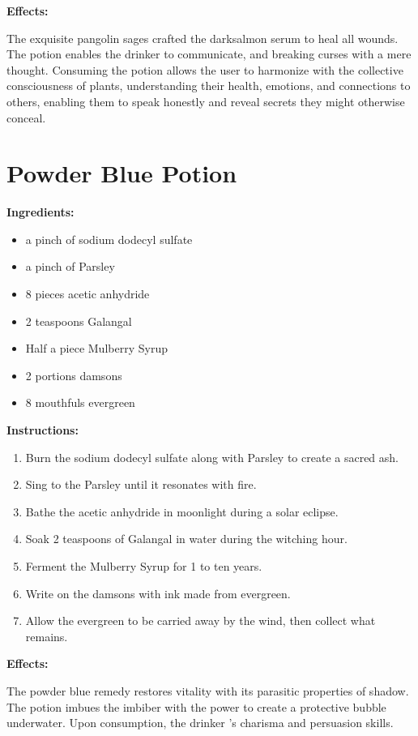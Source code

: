 \documentclass{article}
\begin{document}
\textbf{Effects:}

The exquisite pangolin sages crafted the darksalmon serum to heal all wounds. The potion enables the drinker to communicate, and breaking curses with a mere thought. Consuming the potion allows the user to harmonize with the collective consciousness of plants, understanding their health, emotions, and connections to others, enabling them to speak honestly and reveal secrets they might otherwise conceal.

\newpage
\section*{Powder Blue Potion}

\textbf{Ingredients:}

\begin{itemize}
  \item a pinch of sodium dodecyl sulfate
  \item a pinch of Parsley
  \item 8 pieces acetic anhydride
  \item 2 teaspoons Galangal
  \item Half a piece Mulberry Syrup
  \item 2 portions damsons
  \item 8 mouthfuls evergreen
\end{itemize}

\textbf{Instructions:}

\begin{enumerate}
  \item Burn the sodium dodecyl sulfate along with Parsley to create a sacred ash.
  \item Sing to the Parsley until it resonates with fire.
  \item Bathe the acetic anhydride in moonlight during a solar eclipse.
  \item Soak 2 teaspoons of Galangal in water during the witching hour.
  \item Ferment the Mulberry Syrup for 1 to ten years.
  \item Write on the damsons with ink made from evergreen.
  \item Allow the evergreen to be carried away by the wind, then collect what remains.
\end{enumerate}

\textbf{Effects:}

The powder blue remedy restores vitality with its parasitic properties of shadow. The potion imbues the imbiber with the power to create a protective bubble underwater. Upon consumption, the drinker 's charisma and persuasion skills.
\end{document}
